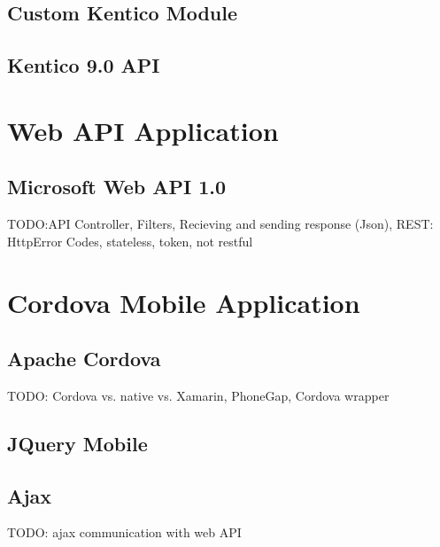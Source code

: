 \subsection{Custom Kentico Module}
\subsection{Kentico 9.0 API}

\section{Web API Application}
\subsection{Microsoft Web API 1.0}
TODO:API Controller, Filters, Recieving and sending response (Json), REST: HttpError Codes, stateless, token, not restful

\section{Cordova Mobile Application}
\subsection{Apache Cordova}
TODO: Cordova vs. native vs. Xamarin, PhoneGap, Cordova wrapper
\subsection{JQuery Mobile}
\subsection{Ajax}
TODO: ajax communication with web API


